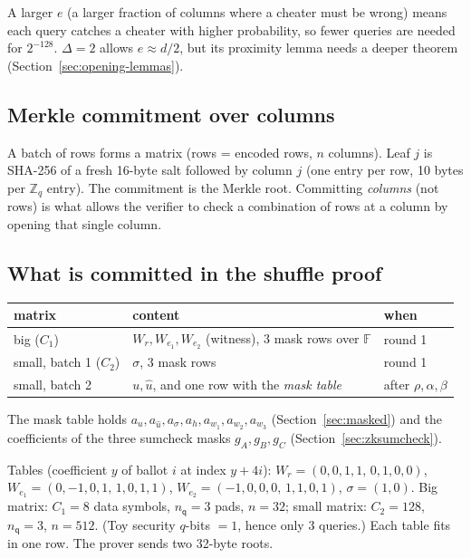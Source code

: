 \documentclass[11pt,a4paper]{article}
\newcommand{\Zq}{\mathbb{Z}_q}
\newcommand{\F}{\mathbb{F}}
\newcommand{\nq}{n_{\mathsf{q}}}
\newcommand{\uh}{\hat{u}}
\theoremstyle{definition}
\theoremstyle{plain}
\begin{document}
\begin{why}[Why $\Delta=2$ needs fewer queries]
A larger $e$ (a larger fraction of columns where a cheater must be wrong) means each query catches
a cheater with higher probability, so fewer queries are needed for $2^{-128}$. $\Delta=2$ allows
$e\approx d/2$, but its proximity lemma needs a deeper theorem (Section~\ref{sec:opening-lemmas}).
\end{why}

\subsection{Merkle commitment over columns}

A batch of rows forms a matrix (rows = encoded rows, $n$ columns). Leaf $j$ is SHA-256 of a fresh 16-byte
salt followed by column $j$ (one entry per row, 10 bytes per $\Zq$ entry). The commitment is the Merkle
root. Committing \emph{columns} (not rows) is what allows the verifier to check a combination of rows
at a column by opening that single column.

\subsection{What is committed in the shuffle proof}

\begin{center}
\begin{tabular}{@{}lll@{}}
\toprule
matrix & content & when\\\midrule
big ($C_1$) & $W_r,W_{e_1},W_{e_2}$ (witness), 3 mask rows over $\F$ & round 1\\
small, batch 1 ($C_2$) & $\sigma$, 3 mask rows & round 1\\
small, batch 2 & $u,\uh$, and one row with the \emph{mask table} & after $\rho,\alpha,\beta$\\
\bottomrule
\end{tabular}
\end{center}
The mask table holds $a_u,a_{\uh},a_\sigma,a_h,a_{w_1},a_{w_2},a_{w_3}$ (Section~\ref{sec:masked}) and
the coefficients of the three sumcheck masks $g_A,g_B,g_C$ (Section~\ref{sec:zksumcheck}).

\begin{toyrun}[Round 1]
Tables (coefficient $y$ of ballot $i$ at index $y+4i$):
$W_r=(0,0,1,1,\,0,1,0,0)$, $W_{e_1}=(0,-1,0,1,\,1,0,1,1)$, $W_{e_2}=(-1,0,0,0,\,1,1,0,1)$, $\sigma=(1,0)$.
Big matrix: $C_1=8$ data symbols, $\nq=3$ pads, $n=32$; small matrix: $C_2=128$, $\nq=3$, $n=512$.
(Toy security $q$-bits $=1$, hence only 3 queries.) Each table fits in one row. The prover sends two
32-byte roots.
\end{toyrun}
\end{document}
